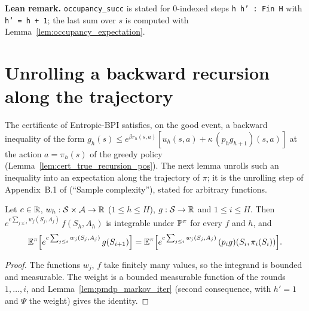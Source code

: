 \textbf{Lean remark.} \texttt{occupancy\_succ} is stated for $0$-indexed steps \texttt{h h' : Fin H}
with \texttt{h' = h + 1}; the last sum over $s$ is computed with
Lemma~\ref{lem:occupancy_expectation}.

\section{Unrolling a backward recursion along the trajectory}
\label{sec:pre_mdp_unroll}

The certificate of Entropic-BPI satisfies, on the good event, a backward inequality of the
form $g_h(s) \le e^{\beta r_h(s,a)}[u_h(s,a) + \kappa\,(p_h g_{h+1})(s,a)]$ at the action
$a = \pi_h(s)$ of the greedy policy (Lemma~\ref{lem:cert_true_recursion_pos}). The next lemma
unrolls such an inequality into an expectation along the trajectory of $\pi$; it is the
unrolling step of Appendix~B.1 of \cite{essakine2026tight} (``Sample complexity''), stated for
arbitrary functions.

\begin{lemma}\label{lem:pmdp_weighted_next_state}
\leanok
{}
Let $c \in \mathbb{R}$, $w_h : \mathcal{S} \times \mathcal{A} \to \mathbb{R}$ ($1 \le h \le H$), $g : \mathcal{S} \to \mathbb{R}$ and $1 \le i \le H$.
Then $e^{c\sum_{j \le i} w_j(S_j, A_j)}\,f(S_h, A_h)$ is integrable under $\mathbb{P}^\pi$ for every
$f$ and $h$, and
\[
  \mathbb{E}^\pi\Big[e^{c\sum_{j \le i} w_j(S_j, A_j)}\,g(S_{i+1})\Big]
  = \mathbb{E}^\pi\Big[e^{c\sum_{j \le i} w_j(S_j, A_j)}\,(p_i g)(S_i, \pi_i(S_i))\Big] .
\]
\end{lemma}

\begin{proof}
\leanok
The functions $w_j$, $f$ take finitely many values, so the integrand is bounded and measurable.
The weight is a bounded measurable function of the rounds $1, \dots, i$, and
Lemma~\ref{lem:pmdp_markov_iter} (second consequence, with $h' = 1$ and $\Psi$ the weight) gives
the identity.
\end{proof}

